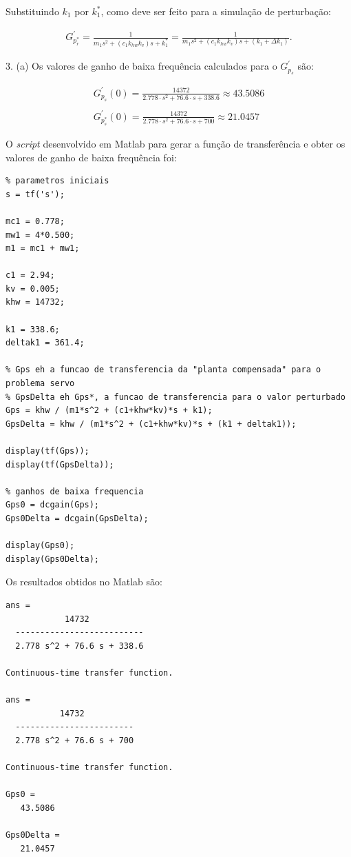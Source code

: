 \documentclass[a4paper,11pt]{article}
\begin{document}
Substituindo $k_1$ por $k_1^\ast$, como deve ser feito para a simulação de
perturbação:

\begin{gather*}
    G^\prime_{p_r^\ast} =
        \frac{1}{m_1s^2 + \left( c_1 k_{hw} k_v \right) s + k_1^\ast} =
        \frac{1}{m_1s^2 + \left( c_1 k_{hw} k_v \right) s +
        \left( k_1 + \Delta k_1 \right)}.
\end{gather*}

3. (a) Os valores de ganho de baixa frequência calculados para o $G^\prime_{p_s}$ são:

\begin{gather*}
    G^\prime_{p_s} \left( 0 \right) = \frac{14372}{2.778 \cdot s^2 + 76.6 \cdot
        s + 338.6} \approx 43.5086 \\ \\
    G^\prime_{p_s^\ast} \left( 0 \right) = \frac{14372}{2.778 \cdot s^2 + 76.6
        \cdot s + 700} \approx 21.0457
\end{gather*}

\pagebreak

O \textit{script} desenvolvido em Matlab para gerar a função de transferência e
obter os valores de ganho de baixa frequência foi:

\begin{lstlisting}
% parametros iniciais
s = tf('s');

mc1 = 0.778;
mw1 = 4*0.500;
m1 = mc1 + mw1;

c1 = 2.94;
kv = 0.005;
khw = 14732;

k1 = 338.6;
deltak1 = 361.4;

% Gps eh a funcao de transferencia da "planta compensada" para o problema servo
% GpsDelta eh Gps*, a funcao de transferencia para o valor perturbado
Gps = khw / (m1*s^2 + (c1+khw*kv)*s + k1);
GpsDelta = khw / (m1*s^2 + (c1+khw*kv)*s + (k1 + deltak1));

display(tf(Gps));
display(tf(GpsDelta));

% ganhos de baixa frequencia
Gps0 = dcgain(Gps);
Gps0Delta = dcgain(GpsDelta);

display(Gps0);
display(Gps0Delta);
\end{lstlisting}

Os resultados obtidos no Matlab são:

\begin{lstlisting}
ans =
            14732
  --------------------------
  2.778 s^2 + 76.6 s + 338.6
 
Continuous-time transfer function.

ans =
           14732
  ------------------------
  2.778 s^2 + 76.6 s + 700
 
Continuous-time transfer function.

Gps0 =
   43.5086

Gps0Delta =
   21.0457
\end{lstlisting}
\end{document}
